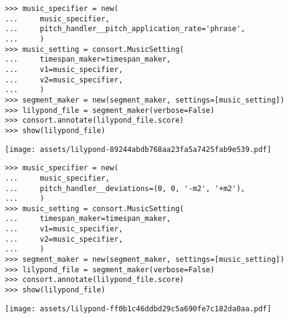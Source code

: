 \begin{comment}
<abjad>[stylesheet=../consort.ily]
music_specifier = new(
    music_specifier,
    pitch_handler__pitch_application_rate='phrase',
    )
music_setting = consort.MusicSetting(
    timespan_maker=timespan_maker,
    v1=music_specifier,
    v2=music_specifier,
    )
segment_maker = new(segment_maker, settings=[music_setting])
lilypond_file = segment_maker(verbose=False)
consort.annotate(lilypond_file.score)
show(lilypond_file)
</abjad>
\end{comment}

\begin{abjadbookoutput}
\begin{singlespacing}
\vspace{-0.5\baselineskip}
\begin{lstlisting}
>>> music_specifier = new(
...     music_specifier,
...     pitch_handler__pitch_application_rate='phrase',
...     )
>>> music_setting = consort.MusicSetting(
...     timespan_maker=timespan_maker,
...     v1=music_specifier,
...     v2=music_specifier,
...     )
>>> segment_maker = new(segment_maker, settings=[music_setting])
>>> lilypond_file = segment_maker(verbose=False)
>>> consort.annotate(lilypond_file.score)
>>> show(lilypond_file)
\end{lstlisting}
\noindent\texttt{[image: assets/lilypond-89244abdb768aa23fa5a7425fab9e539.pdf]}
\end{singlespacing}
\end{abjadbookoutput}

\begin{comment}
<abjad>[stylesheet=../consort.ily]
music_specifier = new(
    music_specifier,
    pitch_handler__deviations=(0, 0, '-m2', '+m2'),
    )
music_setting = consort.MusicSetting(
    timespan_maker=timespan_maker,
    v1=music_specifier,
    v2=music_specifier,
    )
segment_maker = new(segment_maker, settings=[music_setting])
lilypond_file = segment_maker(verbose=False)
consort.annotate(lilypond_file.score)
show(lilypond_file)
</abjad>
\end{comment}

\begin{abjadbookoutput}
\begin{singlespacing}
\vspace{-0.5\baselineskip}
\begin{lstlisting}
>>> music_specifier = new(
...     music_specifier,
...     pitch_handler__deviations=(0, 0, '-m2', '+m2'),
...     )
>>> music_setting = consort.MusicSetting(
...     timespan_maker=timespan_maker,
...     v1=music_specifier,
...     v2=music_specifier,
...     )
>>> segment_maker = new(segment_maker, settings=[music_setting])
>>> lilypond_file = segment_maker(verbose=False)
>>> consort.annotate(lilypond_file.score)
>>> show(lilypond_file)
\end{lstlisting}
\noindent\texttt{[image: assets/lilypond-ff0b1c46ddbd29c5a690fe7c182da0aa.pdf]}
\end{singlespacing}
\end{abjadbookoutput}

